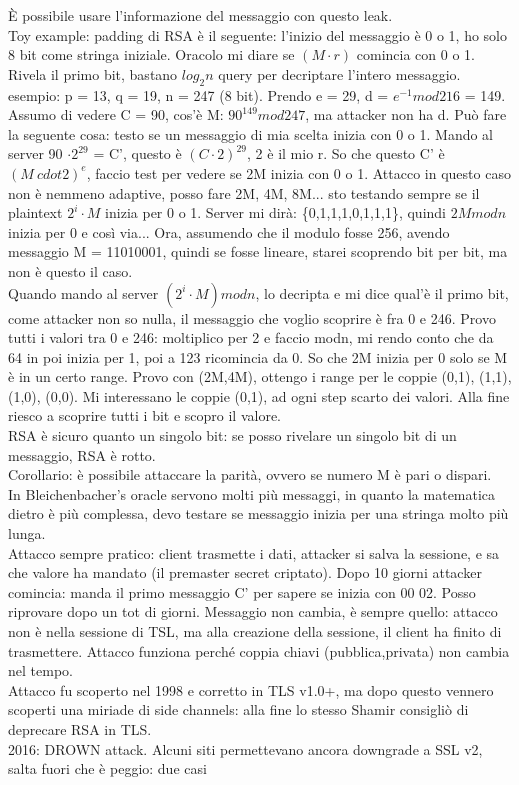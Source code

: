 \documentclass[16px]{article}
\begin{document}
È possibile usare l'informazione del messaggio con questo leak.\\ Toy example: padding di RSA è il seguente: l'inizio del messaggio è 0 o 1, ho solo 8 bit come stringa iniziale. Oracolo mi diare se $(M \cdot r)$ comincia con 0 o 1. Rivela il primo bit, bastano $log_{2}n$ query per decriptare l'intero messaggio. esempio: p = 13, q = 19, n = 247 (8 bit). Prendo e = 29, d = $e^{-1}mod216$ = 149. Assumo di vedere C = 90, cos'è M: $90^{149}mod247$, ma attacker non ha d. Può fare la seguente cosa: testo se un messaggio di mia scelta inizia con 0 o 1. Mando al server 90 $\cdot 2^{29}$ = C', questo è $(C \cdot 2)^{29}$, 2 è il mio r. So che questo C' è $(M\ cdot 2)^e$, faccio test per vedere se 2M inizia con 0 o 1. Attacco in questo caso non è nemmeno adaptive, posso fare 2M, 4M, 8M... sto testando sempre se il plaintext $2^i \cdot M$ inizia per 0 o 1. Server mi dirà: \{0,1,1,1,0,1,1,1\}, quindi $2Mmodn$ inizia per 0 e così via... Ora, assumendo che il modulo fosse 256, avendo messaggio M = 11010001, quindi se fosse lineare, starei scoprendo bit per bit, ma non è questo il caso.\\ Quando mando al server $(2^i \cdot M)modn$, lo decripta e mi dice qual'è il primo bit, come attacker non so nulla, il messaggio che voglio scoprire è fra 0 e 246. Provo tutti i valori tra 0 e 246: moltiplico per 2 e faccio modn, mi rendo conto che da 64 in poi inizia per 1, poi a 123 ricomincia da 0. So che 2M inizia per 0 solo se M è in un certo range. Provo con (2M,4M), ottengo i range per le coppie (0,1), (1,1), (1,0), (0,0). Mi interessano le coppie (0,1), ad ogni step scarto dei valori. Alla fine riesco a scoprire tutti i bit e scopro il valore.\\ RSA è sicuro quanto un singolo bit: se posso rivelare un singolo bit di un messaggio, RSA è rotto.\\ Corollario: è possibile attaccare la parità, ovvero se numero M è pari o dispari.\\ In Bleichenbacher's oracle servono molti più messaggi, in quanto la matematica dietro è più complessa, devo testare se messaggio inizia per una stringa molto più lunga.\\ Attacco sempre pratico: client trasmette i dati, attacker si salva la sessione, e sa che valore ha mandato (il premaster secret criptato). Dopo 10 giorni attacker comincia: manda il primo messaggio C' per sapere se inizia con 00 02. Posso riprovare dopo un tot di giorni. Messaggio non cambia, è sempre quello: attacco non è nella sessione di TSL, ma alla creazione della sessione, il client ha finito di trasmettere. Attacco funziona perché coppia chiavi (pubblica,privata) non cambia nel tempo.\\ Attacco fu scoperto nel 1998 e corretto in TLS v1.0+, ma dopo questo vennero scoperti una miriade di side channels: alla fine lo stesso Shamir consigliò di deprecare RSA in TLS.\\ 2016: DROWN attack. Alcuni siti permettevano ancora downgrade a SSL v2, salta fuori che è peggio: due casi
\end{document}
